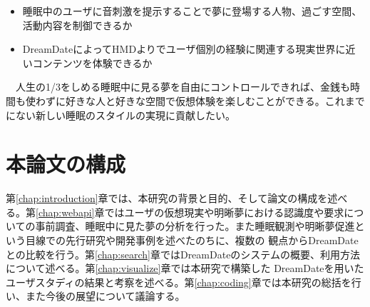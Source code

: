 \begin{itemize}
\item 睡眠中のユーザに音刺激を提示することで夢に登場する人物、過ごす空間、活動内容を制御できるか
\item DreamDateによってHMDよりでユーザ個別の経験に関連する現実世界に近いコンテンツを体験できるか
\end{itemize}

　人生の1/3をしめる睡眠中に見る夢を自由にコントロールできれば、金銭も時間も使わずに好きな人と好きな空間で仮想体験を楽しむことができる。これまでにない新しい睡眠のスタイルの実現に貢献したい。

\section{本論文の構成}
第\ref{chap:introduction}章では、本研究の背景と目的、そして論文の構成を述べる。第\ref{chap:webapi}章ではユーザの仮想現実や明晰夢における認識度や要求についての事前調査、睡眠中に見た夢の分析を行った。また睡眠観測や明晰夢促進という目線での先行研究や開発事例を述べたのちに、複数の 観点からDreamDateとの比較を行う。第\ref{chap:search}章ではDreamDateのシステムの概要、利用方法 について述べる。第\ref{chap:visualize}章では本研究で構築した DreamDateを用いたユーザスタディの結果と考察を述べる。第\ref{chap:coding}章では本研究の総括を行い、また今後の展望について議論する。
